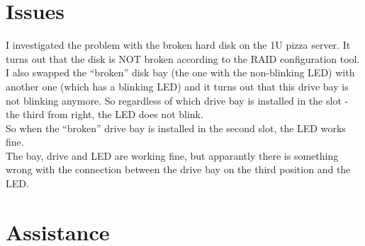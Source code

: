 \documentclass[11pt, a4paper]{article}
\begin{document}
\section*{Issues}
\label{sec:issues}
I investigated the problem with the broken hard disk on the 1U pizza server. It turns out that the disk is NOT broken according to the RAID configuration tool. \\
I also swapped the ``broken'' disk bay (the one with the non-blinking LED) with another one (which has a blinking LED) and it turns out that this drive bay is not blinking anymore. So regardless of which drive bay is installed in the slot - the third from right, the LED does not blink. \\
So when the ``broken'' drive bay is installed in the second slot, the LED works fine. \\
The bay, drive and LED are working fine, but apparantly there is something wrong with the connection between the drive bay on the third position and the LED.


\section*{Assistance}
\end{document}
